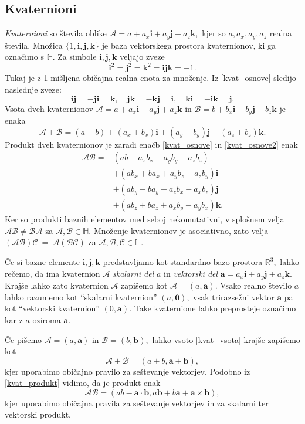 \documentclass[12pt,a4paper,twoside]{article}
\theoremstyle{definition} %
\theoremstyle{plain} %
\theoremstyle{primerstyle}
\numberwithin{equation}{section}  %
\newcommand{\R}{\mathbb R}
\newcommand{\quat}{\mathbb H}
\newcommand{\aV}{\mathbf{a}}
\newcommand{\bV}{\mathbf{b}}
\newcommand{\iV}{\mathbf{i}}
\newcommand{\jV}{\mathbf{j}}
\newcommand{\kV}{\mathbf{k}}
\newcommand{\AQ}{\mathcal{A}}
\newcommand{\BQ}{\mathcal{B}}
\newcommand{\CQ}{\mathcal{C}}
\begin{document}
\subsection{Kvaternioni}
\label{kvaternioni_poglavje}

\emph{Kvaternioni} so števila oblike $\AQ=a+a_x\iV+a_y\jV+a_z\kV,$ kjer so $a,a_x,a_y,a_z$ realna števila. Množica $\{1,\iV,\jV,\kV\}$ je baza vektorskega prostora kvaternionov, ki ga označimo s $\quat.$ Za simbole $\iV,\jV,\kV$ veljajo zveze
\begin{equation}
	\label{kvat_osnove}
	\iV^2=\jV^2=\kV^2=\iV\jV\kV=-1.
\end{equation}
Tukaj je z 1 mišljena običajna realna enota za množenje. Iz \eqref{kvat_osnove} sledijo naslednje zveze:
\begin{equation}
	\label{kvat_osnove2}
	\iV\jV=-\jV\iV=\kV,\quad\jV\kV=-\kV\jV=\iV,\quad\kV\iV=-\iV\kV=\jV.
\end{equation}
Vsota dveh kvaternionov $\AQ=a+a_x\iV+a_y\jV+a_z\kV$ in $\BQ=b+b_x\iV+b_y\jV+b_z\kV$ je enaka
\begin{equation}
	\label{kvat_vsota}
	\AQ+\BQ=(a+b)+(a_x+b_x)\iV+(a_y+b_y)\jV+(a_z+b_z)\kV.
\end{equation}
Produkt dveh kvaternionov je zaradi enačb \eqref{kvat_osnove} in \eqref{kvat_osnove2} enak
\begin{align}
	\AQ\BQ=&(ab-a_xb_x-a_yb_y-a_zb_z)\nonumber\\
	&+(ab_x+ba_x+a_yb_z-a_zb_y)\iV\label{kvat_produkt}\\
	&+(ab_y+ba_y+a_zb_x-a_xb_z)\jV\nonumber\\
	&+(ab_z+ba_z+a_xb_y-a_yb_x)\kV.\nonumber
\end{align}
Ker so produkti baznih elementov med seboj nekomutativni, v splošnem velja $\AQ\BQ\neq\BQ\AQ$ za $\AQ,\BQ\in\quat.$ Množenje kvaternionov je asociativno, zato velja $(\AQ\BQ)\CQ~=~\AQ(\BQ\CQ)$ za $\AQ,\BQ,\CQ\in\quat.$

Če si bazne elemente $\iV,\jV,\kV$ predstavljamo kot standardno bazo prostora $\R^3,$ lahko rečemo, da ima kvaternion $\AQ$ \emph{skalarni del} $a$ in \emph{vektorski del} $\aV=a_x\iV+a_y\jV+a_z\kV.$ Krajše lahko zato kvaternion $\AQ$ zapišemo kot $\AQ=(a,\aV).$ Vsako realno število $a$ lahko razumemo kot ``skalarni kvaternion'' $(a,\mathbf{0}),$ vsak trirazsežni vektor $\aV$ pa kot ``vektorski kvaternion'' $(0,\aV).$ Take kvaternione lahko preprosteje označimo kar z $a$ oziroma $\aV.$

Če pišemo $\AQ=(a,\aV)$ in $\BQ=(b,\bV),$ lahko vsoto \eqref{kvat_vsota} krajše zapišemo kot
\begin{equation}
	\label{kvat_vsota2}
	\AQ+\BQ=(a+b,\aV+\bV),
\end{equation}
kjer uporabimo običajno pravilo za seštevanje vektorjev. Podobno iz \eqref{kvat_produkt} vidimo, da je produkt enak
\begin{equation}
	\label{kvat_produkt2}
	\AQ\BQ=(ab-\aV\cdot\bV,a\bV+b\aV+\aV\times\bV),
\end{equation}
kjer uporabimo običajna pravila za seštevanje vektorjev in za skalarni ter vektorski produkt.
\end{document}
